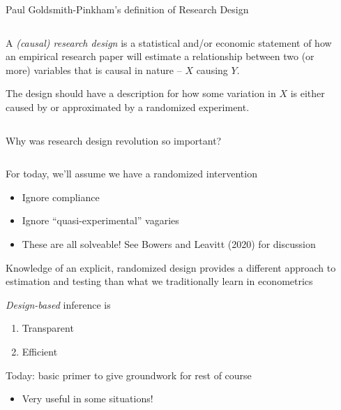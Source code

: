 \documentclass[notes,11pt, aspectratio=169]{beamer}
\newenvironment{wideitemize}{\itemize\addtolength{\itemsep}{10pt}}{\enditemize}
\begin{document}
\begin{frame}{Paul Goldsmith-Pinkham's definition of Research Design}
\begin{columns}[T] %
  \begin{column}{.7\textwidth}
    \begin{wideitemize}
    \item A \emph{(causal) research design} is a statistical and/or economic
      statement of how an empirical research paper will estimate a
      relationship between two (or more) variables that is causal in nature -- $X$ causing $Y$.

    \item The design should have a description for how some
      variation in $X$ is either caused by or approximated by a
      randomized experiment.
    \end{wideitemize}
\end{column}%
\hfill%
\begin{column}{.6\textwidth}
\end{column}%
\end{columns}
\end{frame}


\begin{frame}{Why was research design revolution so important?}
\begin{columns}[T] %
  \begin{column}{.7\textwidth}
    \begin{wideitemize}
    \item For today, we'll assume we have a randomized intervention
      \begin{itemize}
      \item Ignore compliance
      \item Ignore ``quasi-experimental'' vagaries
      \item These are all solveable! See Bowers and Leavitt (2020) for discussion
      \end{itemize}
    \item Knowledge of an explicit, randomized design provides a different
      approach to estimation and testing than what we traditionally learn in econometrics
    \item \emph{Design-based} inference is
      \begin{enumerate}
      \item Transparent
      \item Efficient
      \end{enumerate}
    \item Today: basic primer to give groundwork for rest of course
      \begin{itemize}
      \item Very useful in some situations!
      \end{itemize}
    \end{wideitemize}
\end{column}%
\hfill%
\begin{column}{.6\textwidth}
\end{column}%
\end{columns}
\end{frame}
\end{document}
